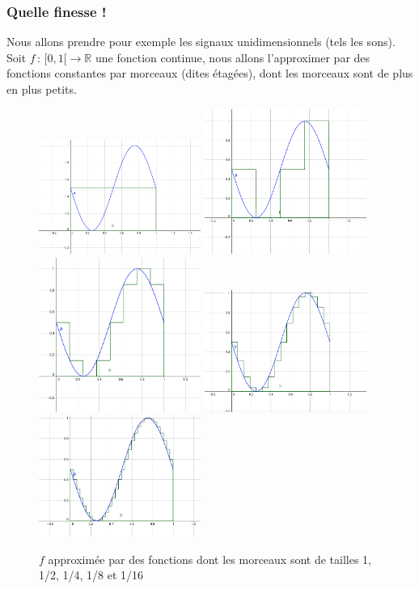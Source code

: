 \documentclass[]{article}
\theoremstyle{remark}
\theoremstyle{definition}
\newcommand{\funcshort}[3]{
	#1 \, : \, #2 \longrightarrow #3
}
\begin{document}
	\subsubsection*{Quelle finesse !}
	
	Nous allons prendre pour exemple les signaux unidimensionnels (tels les sons). Soit $\funcshort{f}{[0, 1[}{\mathbb{R}}$ une fonction continue, nous allons l'approximer par des fonctions constantes par morceaux (dites étagées), dont les morceaux sont de plus en plus petits.
	
	\begin{figure}[h]
		\label{sine-stairs}
		\centering
		\includegraphics[width=150pt]{sin_1.png}
		\includegraphics[width=150pt]{sin_2.png}
		\includegraphics[width=150pt]{sin_4.png}
		\includegraphics[width=150pt]{sin_8.png}
		\includegraphics[width=150pt]{sin_16.png}
		\caption{$f$ approximée par des fonctions dont les morceaux sont de tailles 1, 1/2, 1/4, 1/8 et 1/16}
	\end{figure}
	
\end{document}
